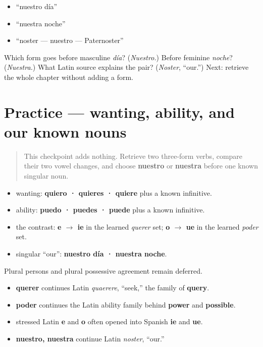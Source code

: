 \begin{itemize}
\raggedright
  \item “nuestro día”
  \item “nuestra noche”
  \item “noster — nuestro — Paternoster”
\end{itemize}

\begin{tcolorbox}[breakable,colback=teal!4,colframe=teal!35!black,title={Before you move on}]
Which form goes before masculine \emph{día}? (\emph{Nuestro.}) Before feminine \emph{noche}? (\emph{Nuestra.}) What Latin source explains the pair? (\emph{Noster}, “our.”) Next: retrieve the whole chapter without adding a form.
\end{tcolorbox}
\section[Practice]{Practice — wanting, ability, and our known nouns}

\label{lesson:ES-C11-practice}



\begin{quote}
This checkpoint adds nothing. Retrieve two three-form verbs, compare their two vowel changes, and choose \textbf{nuestro} or \textbf{nuestra} before one known singular noun.
\end{quote}

\begin{grammarlens}[title={Grammar Lens: the complete small chapter frame}]
\begin{itemize}
\raggedright
  \item wanting: \textbf{quiero · quieres · quiere} plus a known infinitive.
  \item ability: \textbf{puedo · puedes · puede} plus a known infinitive.
  \item the contrast: \textbf{e $\to$ ie} in the learned \emph{querer} set; \textbf{o $\to$ ue} in the learned \emph{poder} set.
  \item singular “our”: \textbf{nuestro día · nuestra noche}.
\end{itemize}

Plural persons and plural possessive agreement remain deferred.
\end{grammarlens}

\begin{cousinweb}
\begin{itemize}
\raggedright
  \item \textbf{querer} continues Latin \emph{quaerere}, “seek,” the family of \textbf{query}.
  \item \textbf{poder} continues the Latin ability family behind \textbf{power} and \textbf{possible}.
  \item stressed Latin \textbf{e} and \textbf{o} often opened into Spanish \textbf{ie} and \textbf{ue}.
  \item \textbf{nuestro, nuestra} continue Latin \emph{noster}, “our.”
\end{itemize}
\end{cousinweb}

